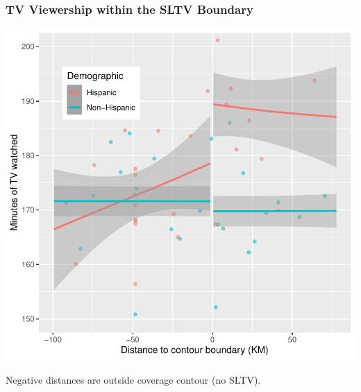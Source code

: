 \documentclass{beamer}
\begin{document}
\begin{frame}
\frametitle{TV Viewership within the SLTV Boundary} \label{atus_time}

\begin{center}
\includegraphics[width=.75\textwidth]{../../analysis/Output/graphs/atus2.pdf}\\
\end{center}
\vspace{-5pt}
\footnotesize Negative distances are outside coverage contour (no SLTV). \hyperlink{atus_breakdown}{}

 

\end{frame}
\end{document}
